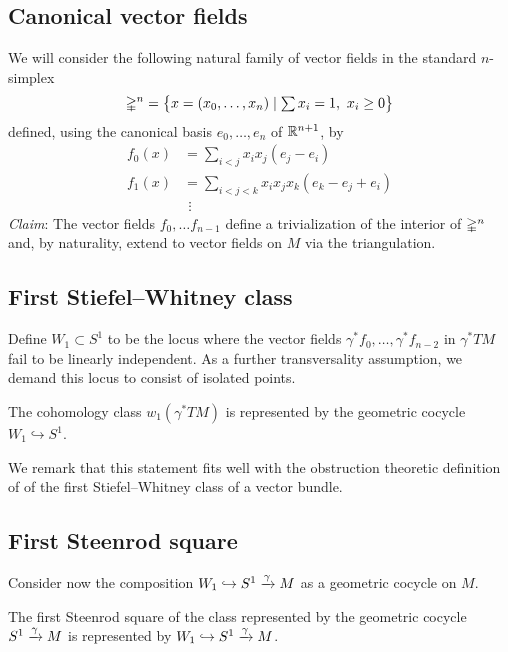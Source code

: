 \subsection*{Canonical vector fields}

We will consider the following natural family of vector fields in the standard $n$-simplex
\[
\gsimplex^n = \set[\big]{x = (x_0, \dots, x_n) \mid \textstyle \sum x_i = 1,\ x_i \geq 0}
\]
defined, using the canonical basis $e_0, \dots, e_n$ of $\R^{n+1}$, by
\begin{align*}
	f_0(x) &= \sum_{i < j} x_i x_j (e_j - e_i) \\
	f_1(x) &= \sum_{i < j < k} x_i x_j x_k (e_k - e_j + e_i) \\
	&\ \, \vdots
\end{align*}
\textit{Claim}: The vector fields $f_0, \dots f_{n-1}$ define a trivialization of the interior of $\gsimplex^n$ and, by naturality, extend to vector fields on $M$ via the triangulation.

\subsection*{First Stiefel--Whitney class}

Define $W_1 \subset S^1$ to be the locus where the vector fields $\gamma^\ast f_0, \dots, \gamma^\ast f_{n-2}$ in $\gamma^\ast TM$ fail to be linearly independent.
As a further transversality assumption, we demand this locus to consist of isolated points.

\begin{proposition}
	The cohomology class $w_1(\gamma^\ast TM)$ is represented by the geometric cocycle $W_1 \hookrightarrow S^1$.
\end{proposition}

We remark that this statement fits well with the obstruction theoretic definition of of the first Stiefel--Whitney class of a vector bundle.

\subsection*{First Steenrod square}

Consider now the composition $W_1 \hookrightarrow S^1 \xra{\gamma} M$ as a geometric cocycle on $M$.

\begin{proposition}
	The first Steenrod square of the class represented by the geometric cocycle $S^1 \xra{\gamma} M$ is represented by $W_1 \hookrightarrow S^1 \xra{\gamma} M$.
\end{proposition}

